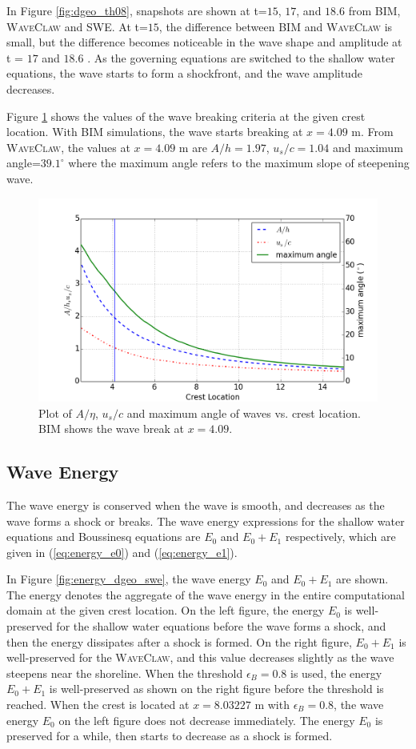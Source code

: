 \documentclass[review]{elsarticle}
\begin{document}
In Figure \ref{fig:dgeo_th08}, snapshots are shown at 
t=$15$, $17$, and $18.6$ from BIM, \textsc{WaveClaw} 
and SWE.
At t=$15$, the difference between BIM and \textsc{WaveClaw}
is small, but the difference becomes noticeable 
in the wave shape and amplitude at t = $17$ and $18.6$ . 
As the governing equations are switched to the shallow water equations,
the wave starts to form a shockfront, and the wave amplitude decreases.

Figure \ref{fig:wave_break_criteria} shows 
the values of the wave breaking criteria at the given crest location. 
With BIM simulations, the wave starts breaking at $x=4.09$ m. 
From \textsc{WaveClaw}, the values at $x=4.09$ m are
$A/h=1.97$, $u_s/c=1.04$ and maximum angle=$39.1^\circ$
where the maximum angle refers to 
the maximum slope of steepening wave.

\begin{figure}[!htb]
\centering
\includegraphics[width=.7\textwidth]{_fig/wave_break}
\caption{Plot of $A/\eta$, $u_s/c$ and maximum angle of waves vs. crest location. 
BIM shows the wave break at $x=4.09$. }
\label{fig:wave_break_criteria}
\end{figure}

\subsection{Wave Energy}

The wave energy is conserved when the wave is smooth, 
and decreases as the wave forms a shock or breaks.
The wave energy expressions 
for the shallow water equations and Boussinesq equations
are $E_0$ and $E_0+E_1$  respectively, 
which are given in (\ref{eq:energy_e0}) and (\ref{eq:energy_e1}). 

In Figure \ref{fig:energy_dgeo_swe}, 
the wave energy $E_0$ and $E_0+E_1$ are shown. 
The energy denotes the aggregate 
of the wave energy in the entire computational domain 
at the given crest location.
On the left figure, 
the energy $E_0$ is well-preserved 
for the shallow water equations 
before the wave forms a shock,
and then the energy dissipates after a shock is formed.
On the right figure, 
$E_0+E_1$ is well-preserved for the \textsc{WaveClaw},
and this value decreases slightly as the wave steepens
near the shoreline.
When the threshold $\epsilon_B=0.8$ is used,
the energy $E_0+E_1$ is well-preserved 
as shown on the right figure before the threshold is reached. 
When the crest is located
at $x=8.03227$ m with $\epsilon_B=0.8$, 
the wave energy $E_0$ on the left figure 
does not decrease immediately.
The energy $E_0$ is preserved for a while, 
then starts to decrease as a shock is formed. 
\end{document}
